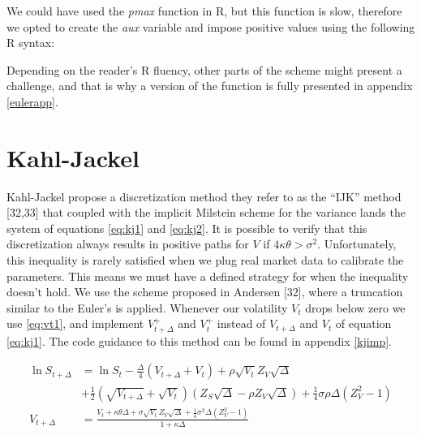 \documentclass[12pt,oneside]{reedthesis}
\theoremstyle{definition}
\theoremstyle{definition}
\theoremstyle{remark}
\begin{document}
  We could have used the \emph{pmax} function in R, but this function is
  slow, therefore we opted to create the \emph{aux} variable and impose
  positive values using the following R syntax:
  \begin{Shaded}
  \begin{Highlighting}[]
  \StringTok{ }
  \NormalTok{  aux[v }\OperatorTok{<}\StringTok{ }\NormalTok{] <-}\StringTok{ }
  \end{Highlighting}
  \end{Shaded}
  Depending on the reader's R fluency, other parts of the scheme might
  present a challenge, and that is why a version of the function is fully
  presented in appendix \ref{eulerapp}.
  
  \section{Kahl-Jackel}\label{kahl-jackel}
  
  Kahl-Jackel propose a discretization method they refer to as the ``IJK''
  method {[}32,33{]} that coupled with the implicit Milstein scheme for
  the variance lands the system of equations \eqref{eq:kj1} and
  \eqref{eq:kj2}. It is possible to verify that this discretization always
  results in positive paths for \(V\) if \(4 \kappa \theta > \sigma^2\).
  Unfortunately, this inequality is rarely satisfied when we plug real
  market data to calibrate the parameters. This means we must have a
  defined strategy for when the inequality doesn't hold. We use the scheme
  proposed in Andersen {[}32{]}, where a truncation similar to the Euler's
  is applied. Whenever our volatility \(V_t\) drops below zero we use
  \eqref{eq:vt1}, and implement \(V_{t+\Delta}^{+}\) and \(V_t^{+}\) instead
  of \(V_{t+\Delta}\) and \(V_t\) of equation \eqref{eq:kj1}. The code
  guidance to this method can be found in appendix \ref{kjimp}.
  \begin{small}
  \begin{align}
  \label{eq:kj1}
  \ln S_{t + \Delta} &= \ln S_t - \frac{\Delta}{4}\left( V_{t+\Delta} + V_t \right) + \rho \sqrt{V_t} Z_V\sqrt{\Delta} \\ \nonumber
  &+ \frac{1}{2} \left( \sqrt{V_{t+\Delta}} + \sqrt{V_t} \right) \left( Z_S \sqrt{\Delta} - \rho Z_V \sqrt{\Delta}\right) + \frac{1}{4} \sigma \rho \Delta \left( Z_{V}^{2} - 1 \right) \\
  \label{eq:kj2}
  V_{t+\Delta} &= \frac{V_t + \kappa \theta \Delta + \sigma \sqrt{V_t} Z_V \sqrt{\Delta}+ \frac{1}{4}\sigma^2 \Delta \left(Z_V^2-1 \right)}{1+ \kappa \Delta}
  \end{align}
  \end{small}
\end{document}
